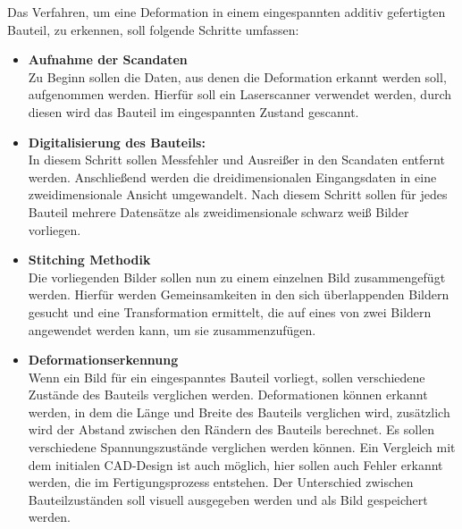Das Verfahren, um eine Deformation in einem eingespannten additiv gefertigten
Bauteil, zu erkennen, soll folgende Schritte umfassen:
\begin{itemize}
    \item \textbf{Aufnahme der Scandaten}\\
        Zu Beginn sollen die Daten, aus denen die Deformation erkannt werden soll, 
        aufgenommen werden. Hierfür soll ein Laserscanner verwendet werden, durch diesen wird 
        das Bauteil im eingespannten Zustand gescannt.
    \item \textbf{Digitalisierung des Bauteils:}\\
        In diesem Schritt sollen Messfehler und Ausreißer
        in den Scandaten entfernt werden. Anschließend werden die dreidimensionalen 
        Eingangsdaten in eine zweidimensionale Ansicht umgewandelt.
        Nach diesem Schritt sollen für jedes Bauteil mehrere Datensätze als 
        zweidimensionale schwarz weiß Bilder vorliegen.
    \item \textbf{Stitching Methodik}\\
        Die vorliegenden Bilder sollen nun zu einem einzelnen Bild zusammengefügt werden.
        Hierfür werden Gemeinsamkeiten in den sich 
        überlappenden Bildern gesucht und eine Transformation ermittelt,
        die auf eines von zwei Bildern angewendet werden kann, um sie zusammenzufügen.
    \item \textbf{Deformationserkennung}\\
        Wenn ein Bild für ein eingespanntes Bauteil vorliegt, sollen verschiedene 
        Zustände des Bauteils verglichen werden. Deformationen können erkannt werden, in dem 
        die Länge und Breite des Bauteils verglichen wird, zusätzlich wird der 
        Abstand zwischen den Rändern des Bauteils berechnet. Es sollen verschiedene
        Spannungszustände verglichen werden können. Ein Vergleich mit dem initialen 
        CAD-Design ist auch möglich, hier sollen auch Fehler erkannt werden, die im 
        Fertigungsprozess entstehen. Der Unterschied zwischen Bauteilzuständen
        soll visuell ausgegeben werden und als Bild gespeichert werden.
        
\end{itemize}
























